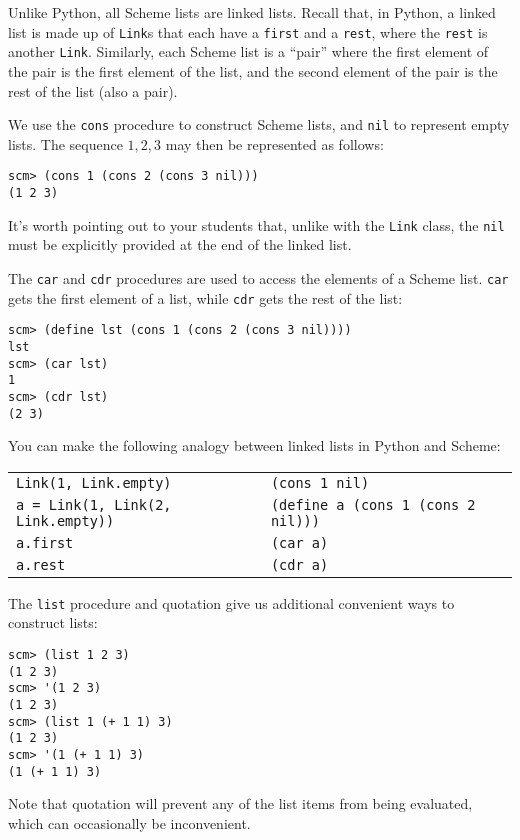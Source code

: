 Unlike Python, all Scheme lists are linked lists. Recall that, in Python, a linked list is made up of \lstinline{Link}s that each have a \lstinline{first} and a \lstinline{rest}, where the \lstinline{rest} is another \lstinline{Link}. Similarly, each Scheme list is a ``pair'' where the first element of the pair is the first element of the list, and the second element of the pair is the rest of the list (also a pair).

We use the \lstinline{cons} procedure to construct Scheme lists, and \lstinline{nil} to represent empty lists. The sequence $1, 2, 3$ may then be represented as follows: 
\begin{lstlisting}
scm> (cons 1 (cons 2 (cons 3 nil)))
(1 2 3)
\end{lstlisting}

\begin{meta}
It's worth pointing out to your students that, unlike with the \lstinline{Link} class, the \lstinline{nil} must be explicitly provided at the end of the linked list. 
\end{meta}

The \lstinline{car} and \lstinline{cdr} procedures are used to access the elements of a Scheme list. \lstinline{car} gets the first element of a list, while \lstinline{cdr} gets the rest of the list: 

\begin{lstlisting}
scm> (define lst (cons 1 (cons 2 (cons 3 nil))))
lst
scm> (car lst)
1
scm> (cdr lst)
(2 3)
\end{lstlisting}

You can make the following analogy between linked lists in Python and Scheme: 
\begin{center}
\begin{tabular}{ |l|l| }
\hline
 \texttt{Link(1, Link.empty)} & \texttt{(cons 1 nil)} \\
 \texttt{a = Link(1, Link(2, Link.empty))} & \texttt{(define a (cons 1 (cons 2 nil)))}  \\
 \texttt{a.first} & \texttt{(car a)} \\
 \texttt{a.rest} & \texttt{(cdr a)} \\
 \hline
\end{tabular}
\end{center}

The \lstinline{list} procedure and quotation give us additional convenient ways to construct lists: 
\begin{lstlisting}
scm> (list 1 2 3)
(1 2 3)
scm> '(1 2 3)
(1 2 3)
scm> (list 1 (+ 1 1) 3)
(1 2 3)
scm> '(1 (+ 1 1) 3)
(1 (+ 1 1) 3)
\end{lstlisting}
Note that quotation will prevent any of the list items from being evaluated, which can occasionally be inconvenient. 

